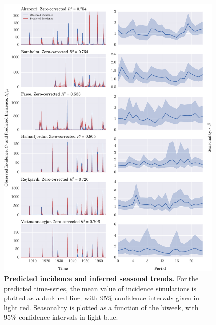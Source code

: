 \documentclass[10pt]{article}
\begin{document}
\begin{figure}[!h]
\centering
\includegraphics[width=\textwidth]{figures/2_predictions.pdf}
\caption{\textbf{Predicted incidence and inferred seasonal trends.} For the predicted time-series, the mean value of incidence simulations is plotted as a dark red line, with 95\% confidence intervals given in light red. Seasonality is plotted as a function of the biweek, with 95\% confidence intervals in light blue.}
\label{figSims}
\end{figure}
\end{document}
